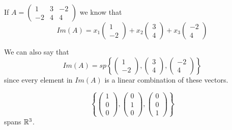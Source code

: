 \documentclass[a4paper,10pt]{article}
\begin{document}
\begin{ex}
	If $A = \begin{pmatrix}
		1  & 3 & -2 \\
		-2 & 4 & 4
	\end{pmatrix}$ we know that
	\[
		Im(A) = x_1
		\begin{pmatrix}
			1 \\
			-2
		\end{pmatrix}
		+ x_2
		\begin{pmatrix}
			3 \\
			4
		\end{pmatrix}
		+ x_3
		\begin{pmatrix}
			-2 \\
			4
		\end{pmatrix}
	\]

	We can also say that
	\[
		Im(A) = sp\left\{
			\begin{pmatrix}
				1 \\
				-2
			\end{pmatrix}
			,
			\begin{pmatrix}
				3 \\
				4
			\end{pmatrix}
			,
			\begin{pmatrix}
				-2 \\
				4
			\end{pmatrix}
		\right\}
	\]
	since every element in $Im(A)$ is a linear combination of these vectors.
\end{ex}

\begin{ex}
	\[
		\left\{
			\begin{pmatrix}
				1 \\
				0 \\
				0
			\end{pmatrix}
			,
			\begin{pmatrix}
				0 \\
				1 \\
				0
			\end{pmatrix}
			,
			\begin{pmatrix}
				0 \\
				0 \\
				1
			\end{pmatrix}
		\right\}
	\]
	spans $\mathbb{R}^3$.
\end{ex}
\end{document}
